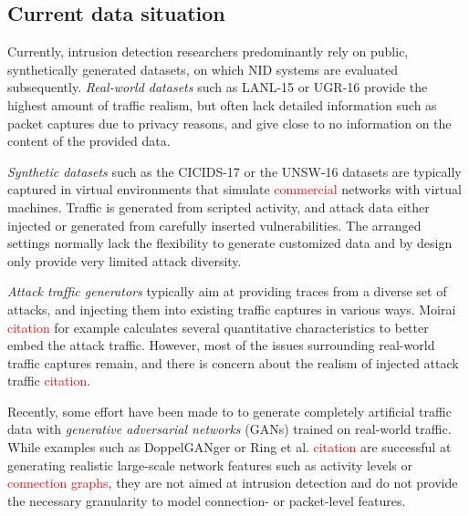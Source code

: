 \documentclass{article}
\begin{document}













\subsection{Current data situation}

Currently, intrusion detection researchers predominantly rely on public, synthetically generated datasets, on which NID systems are evaluated subsequently.
\textit{Real-world datasets} such as LANL-15 \cite{kent-2015-cyberdata1} or UGR-16 \cite{macia2018ugr} provide the highest amount of traffic realism, but often lack detailed information such as packet captures due to privacy reasons, and give close to no information on the content of the provided data. 

\textit{Synthetic datasets} such as the CICIDS-17 \cite{sharafaldin2018towards} or the UNSW-16  \cite{moustafa2015unsw} datasets are typically captured in virtual environments that simulate \textcolor{red}{commercial} networks with virtual machines. Traffic is generated from scripted activity, and attack data either injected or generated from carefully inserted vulnerabilities. The arranged settings normally lack the flexibility to generate customized data and by design only provide very limited attack diversity.

\textit{Attack traffic generators} typically aim at providing traces from a diverse set of attacks, and injecting them into existing traffic captures in various ways. Moirai \textcolor{red}{citation} for example calculates several quantitative characteristics to better embed the attack traffic.  However, most of the issues surrounding real-world traffic captures remain, and there is concern about the realism of injected attack traffic \textcolor{red}{citation}.

Recently, some effort have been made to to generate completely artificial traffic data with \textit{generative adversarial networks} (GANs) trained on real-world traffic. While examples such as DoppelGANger or Ring et al. \textcolor{red}{citation} are successful at generating realistic large-scale network features such as activity levels or \textcolor{red}{connection graphs}, they are not aimed at intrusion detection and do not provide the necessary granularity to model connection- or packet-level features.
\end{document}
